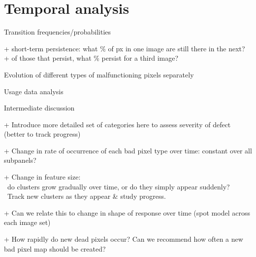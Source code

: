 \documentclass[\main/IO-Pixels.tex]{subfiles}
\begin{document}
\section{Temporal analysis}
\begin{outline}

Transition frequencies/probabilities

+ short-term persistence: what \% of px in one image are still there in the next?\\
+ of those that persist, what \% persist for a third image?

Evolution of different types of malfunctioning pixels separately

Usage data analysis

Intermediate discussion

+ Introduce more detailed set of categories here to assess severity of defect (better to track progress)

+ Change in rate of occurrence of each bad pixel type over time: constant over all subpanels?

+ Change in feature size: \\ \-\ do clusters grow gradually over time, or do they simply appear suddenly?\\ \-\ Track new clusters as they appear \& study progress.

+ Can we relate this to change in shape of response over time (spot model across each image set)

+ How rapidly do new dead pixels occur? Can we recommend how often a new bad pixel map should be created?
\end{outline}

\end{document}
